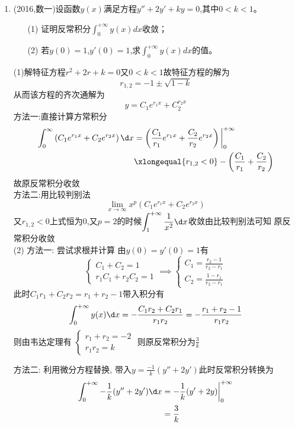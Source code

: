 \documentclass[12pt, a4paper, oneside, UTF8]{ctexbook}
\begin{document}
\begin{enumerate}[label=\arabic*.,start=8]
    \item (2016,数一)设函数$y(x)$满足方程$y''+2y'+ky=0$,其中$0<k<1$。
    \begin{enumerate}[label=(\roman*)]
        \item[(1)] 证明反常积分$\int_0^{+\infty}y(x)dx$收敛；
        \item[(2)] 若$y(0)=1$,$y'(0)=1$,求$\int_0^{+\infty}y(x)dx$的值。
    \end{enumerate}
    
    \begin{solution}
    (1)解特征方程$r^2+2r+k=0$又$0<k<1$故特征方程的解为
    $$
        r_{1,2}=-1\pm\sqrt{1-k}
    $$
    从而该方程的齐次通解为
    $$
        y=C_1e^{r_1x}+C_2^{r_2x}
    $$
    方法一:直接计算方常积分
    \begin{align*}
        \int_{0}^{\infty}\left(C_1e^{r_1x}+C_2e^{r_2x}\right)\d x 
        &= \left(\frac{C_1}{r_1}e^{r_1 x}+\frac{C_2}{r_2}e^{r_2 x}\right)\bigg|^{+\infty}_{0} \\
        &\xlongequal{r_{1,2}<0} -\left(\frac{C_1}{r_1}+\frac{C_2}{r_2}\right) 
    \end{align*}
    故原反常积分收敛  \\
    方法二:用比较判别法
    $$
    \lim_{x\to\infty}x^p(C_1e^{r_1x}+C_2e^{r_2x})
    $$
    又$r_{1,2}<0$上式恒为0,又$p=2$的时候$\displaystyle\int_{1}^{+\infty}\frac{1}{x^2}\d x$收敛由比较判别法可知
    原反常积分收敛 \\
    (2)
    方法一: 尝试求根并计算 由$y(0)=y'(0)=1$有
    $$
    \begin{cases}
        C_1+C_2=1 \\
        r_1C_1+r_2C_2 = 1
    \end{cases} \implies \begin{cases}
        C_1=\frac{r_2-1}{r_2-r_1} \\
        C_2=\frac{1-r_1}{r_2-r_1}
    \end{cases}
    $$
    此时$C_1r_1+C_2r_2=r_1+r_2-1$带入积分有
    $$
    \int_{0}^{+\infty}y(x)\d x = -\frac{C_1r_2+C_2r_1}{r_1r_2}=-\frac{r_1+r_2-1}{r_1r_2}
    $$
    则由韦达定理有
    $\begin{cases}
    r_1+r_2 = -2 \\
    r_1r_2=k
    \end{cases}
    $
    则原反常积分为$\displaystyle\frac{3}{k}$

    方法二: 利用微分方程替换,
    带入$\displaystyle y=\frac{-1}{k}(y''+2y')$此时反常积分转换为
    \begin{align*}
        \int_{0}^{+\infty}-\frac{1}{k}(y''+2y')\d x 
        &= -\frac{1}{k}(y'+2y)\bigg|^{+\infty}_{0} \\
        &= \frac{3}{k}
    \end{align*}
    \end{solution}
\end{enumerate}
\end{document}
